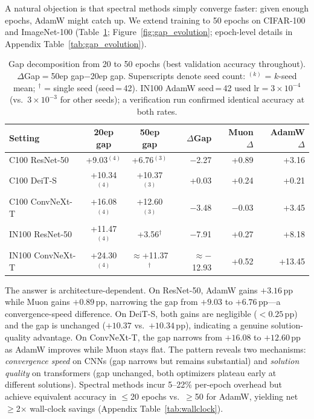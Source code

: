 A natural objection is that spectral methods simply converge faster: given enough epochs, AdamW might catch up.
We extend training to 50 epochs on CIFAR-100 and ImageNet-100 (Table~\ref{tab:gap_narrowing}; Figure~\ref{fig:gap_evolution}; epoch-level details in Appendix Table~\ref{tab:gap_evolution}).

\begin{table}[t]
\centering
\caption{Gap decomposition from 20 to 50 epochs (best validation accuracy throughout). $\Delta$Gap${}={}$50ep gap$-$20ep gap. Superscripts denote seed count: $^{(k)}$ = $k$-seed mean; $^\dagger$ = single seed (seed\,=\,42). IN100 AdamW seed\,=\,42 used $\text{lr}{=}3{\times}10^{-4}$ (vs.\ $3{\times}10^{-3}$ for other seeds); a verification run confirmed identical accuracy at both rates.}
\label{tab:gap_narrowing}
\vspace{-0.5em}
\small
\begin{tabular}{@{}lccrrr@{}}
\toprule
Setting & 20ep gap & 50ep gap & $\Delta$Gap & Muon $\Delta$ & AdamW $\Delta$ \\
\midrule
C100 ResNet-50   & +9.03$^{(4)}$  & +6.76$^{(3)}$  & $-$2.27  & +0.89 & +3.16 \\
C100 DeiT-S      & +10.34$^{(4)}$ & +10.37$^{(3)}$ & +0.03  & +0.24 & +0.21 \\
C100 ConvNeXt-T  & +16.08$^{(4)}$ & +12.60$^{(3)}$  & $-$3.48  & $-$0.03 & +3.45 \\
IN100 ResNet-50  & +11.47$^{(4)}$ & +3.56$^\dagger$  & $-$7.91  & +0.27 & +8.18 \\
IN100 ConvNeXt-T & +24.30$^{(4)}$ & $\approx$+11.37$^\dagger$ & $\approx$$-$12.93 & +0.52 & +13.45 \\
\bottomrule
\end{tabular}
\vspace{-0.5em}
\end{table}

The answer is architecture-dependent.
On ResNet-50, AdamW gains $+3.16$\,pp while Muon gains $+0.89$\,pp, narrowing the gap from $+9.03$ to $+6.76$\,pp---a convergence-speed difference.
On DeiT-S, both gains are negligible ($<0.25$\,pp) and the gap is unchanged ($+10.37$ vs.\ $+10.34$\,pp), indicating a genuine solution-quality advantage.
On ConvNeXt-T, the gap narrows from $+16.08$ to $+12.60$\,pp as AdamW improves while Muon stays flat.
The pattern reveals two mechanisms: \emph{convergence speed} on CNNs (gap narrows but remains substantial) and \emph{solution quality} on transformers (gap unchanged, both optimizers plateau early at different solutions).
Spectral methods incur 5--22\% per-epoch overhead but achieve equivalent accuracy in $\leq$20 epochs vs.\ $\geq$50 for AdamW, yielding net $\geq$2$\times$ wall-clock savings (Appendix Table~\ref{tab:wallclock}).


